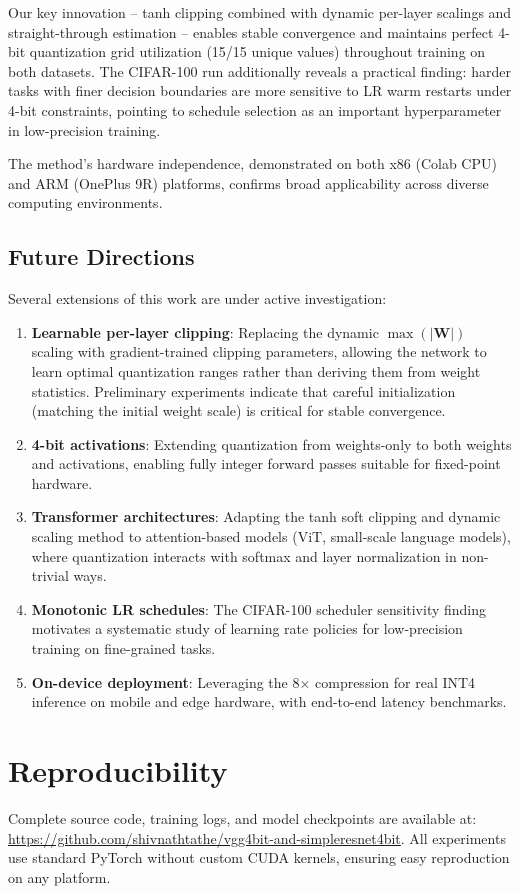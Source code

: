 \documentclass[conference]{IEEEtran}
\begin{document}
Our key innovation -- tanh clipping combined with dynamic per-layer scalings and straight-through estimation -- enables stable convergence and maintains perfect 4-bit quantization grid utilization (15/15 unique values) throughout training on both datasets. The CIFAR-100 run additionally reveals a practical finding: harder tasks with finer decision boundaries are more sensitive to LR warm restarts under 4-bit constraints, pointing to schedule selection as an important hyperparameter in low-precision training.

The method's hardware independence, demonstrated on both x86 (Colab CPU) and ARM (OnePlus 9R) platforms, confirms broad applicability across diverse computing environments.

\subsection{Future Directions}
Several extensions of this work are under active investigation:
\begin{enumerate}
    \item \textbf{Learnable per-layer clipping}: Replacing the dynamic $\max(|\mathbf{W}|)$ scaling with gradient-trained clipping parameters, allowing the network to learn optimal quantization ranges rather than deriving them from weight statistics. Preliminary experiments indicate that careful initialization (matching the initial weight scale) is critical for stable convergence.
    \item \textbf{4-bit activations}: Extending quantization from weights-only to both weights and activations, enabling fully integer forward passes suitable for fixed-point hardware.
    \item \textbf{Transformer architectures}: Adapting the tanh soft clipping and dynamic scaling method to attention-based models (ViT, small-scale language models), where quantization interacts with softmax and layer normalization in non-trivial ways.
    \item \textbf{Monotonic LR schedules}: The CIFAR-100 scheduler sensitivity finding motivates a systematic study of learning rate policies for low-precision training on fine-grained tasks.
    \item \textbf{On-device deployment}: Leveraging the 8$\times$ compression for real INT4 inference on mobile and edge hardware, with end-to-end latency benchmarks.
\end{enumerate}

\section{Reproducibility}
Complete source code, training logs, and model checkpoints are available at: \url{https://github.com/shivnathtathe/vgg4bit-and-simpleresnet4bit}. All experiments use standard PyTorch without custom CUDA kernels, ensuring easy reproduction on any platform.
\end{document}
